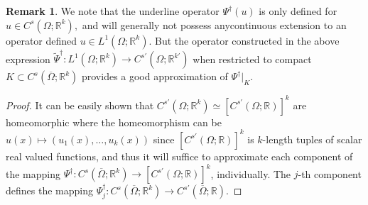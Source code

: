 \documentclass[reqno]{amsart}
\theoremstyle{plain}
\theoremstyle{definition}
\newtheorem{rem}{Remark}
\newcommand{\bb}[1]{\mathbb{#1}}
\begin{document}
\begin{rem}
    We note that the underline operator $\Psi^\dag(u)$ is only defined for $u \in C^s(\Omega;\bb R^k),$ and will generally not possess anycontinuous extension to an operator defined $u \in L^1(\Omega;\bb R^k)$. But the operator constructed in the above expression $\tilde{\Psi}^\dag : L^1(\Omega;\bb R^k) \to C^{s'}(\Omega;\bb R^{k'})$ when restricted to compact $K \subset C^s(\overline{\Omega};\bb R^k)$ provides a good approximation of $\Psi^\dag |_K$.
\end{rem}
\begin{proof}
    It can be easily shown that $C^{s'}(\Omega;\bb R^k) \simeq [C^{s'}(\Omega;\bb R)]^k$ are homeomorphic where the homeomorphism can be $u(x) \mapsto (u_1(x), \dots, u_k(x))$ since $[C^{s'}(\Omega;\bb R)]^k$ is $k$-length tuples of scalar real valued functions, and thus it will suffice to approximate each component of the mapping $\Psi^\dag : C^s(\overline{\Omega};\bb R^k) \to [C^{s'}(\Omega;\bb R)]^k$, individually. The $j$-th component defines the mapping $\Psi^\dag_j : C^s(\overline{\Omega};\bb R^k) \to C^{s'}(\overline{\Omega};\bb R)$. 


\end{proof}
\end{document}
